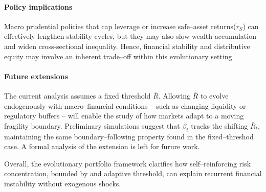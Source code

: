 \documentclass[11pt,a4paper]{article}
\begin{document}
\paragraph{Policy implications} Macro prudential policies that cap leverage or increase safe--asset returns($r_S$) can effectively lengthen stability cycles, but they may also slow wealth accumulation and widen cross-sectional inequality. Hence, financial stability and distributive equity may  involve an inherent trade--off within this evolutionary setting. 

\paragraph{Future extensions} The current analysis assumes a fixed threshold $\bar R$. Allowing $\bar R$ to evolve endogenously with macro--financial conditions -- such as changing liquidity or regulatory buffers -- will enable the study of how markets adapt to a moving fragility boundary. Preliminary simulations suggest that $\beta_t$ tracks the shifting $\bar R_t$, maintaining the same boundary--following property found in the fixed--threshod case. A formal analysis of the extension is left for furure work. 

Overall, the evolutionary portfolio framework clarifies how self--reinforcing risk concentration, bounded by and adaptive threshold, can explain recurrent financial instability without exogenous shocks. 


\end{document}
